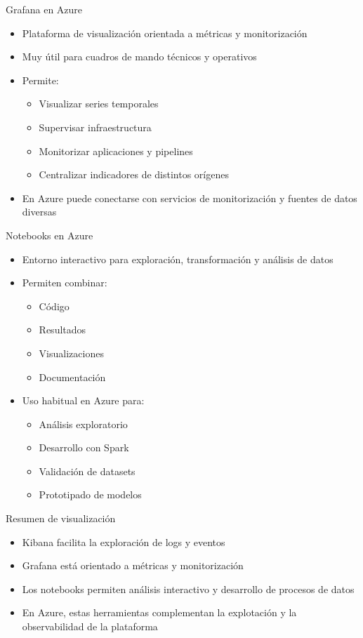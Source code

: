 \documentclass{beamer}
\begin{document}
\begin{frame}{Grafana en Azure}
\begin{itemize}
    \item Plataforma de visualización orientada a métricas y monitorización
    \item Muy útil para cuadros de mando técnicos y operativos
    \item Permite:
    \begin{itemize}
        \item Visualizar series temporales
        \item Supervisar infraestructura
        \item Monitorizar aplicaciones y pipelines
        \item Centralizar indicadores de distintos orígenes
    \end{itemize}
    \item En Azure puede conectarse con servicios de monitorización y fuentes de datos diversas
\end{itemize}
\end{frame}

\begin{frame}{Notebooks en Azure}
\begin{itemize}
    \item Entorno interactivo para exploración, transformación y análisis de datos
    \item Permiten combinar:
    \begin{itemize}
        \item Código
        \item Resultados
        \item Visualizaciones
        \item Documentación
    \end{itemize}
    \item Uso habitual en Azure para:
    \begin{itemize}
        \item Análisis exploratorio
        \item Desarrollo con Spark
        \item Validación de datasets
        \item Prototipado de modelos
    \end{itemize}
\end{itemize}
\end{frame}

\begin{frame}{Resumen de visualización}
\begin{itemize}
    \item Kibana facilita la exploración de logs y eventos
    \item Grafana está orientado a métricas y monitorización
    \item Los notebooks permiten análisis interactivo y desarrollo de procesos de datos
    \item En Azure, estas herramientas complementan la explotación y la observabilidad de la plataforma
\end{itemize}
\end{frame}
\end{document}
